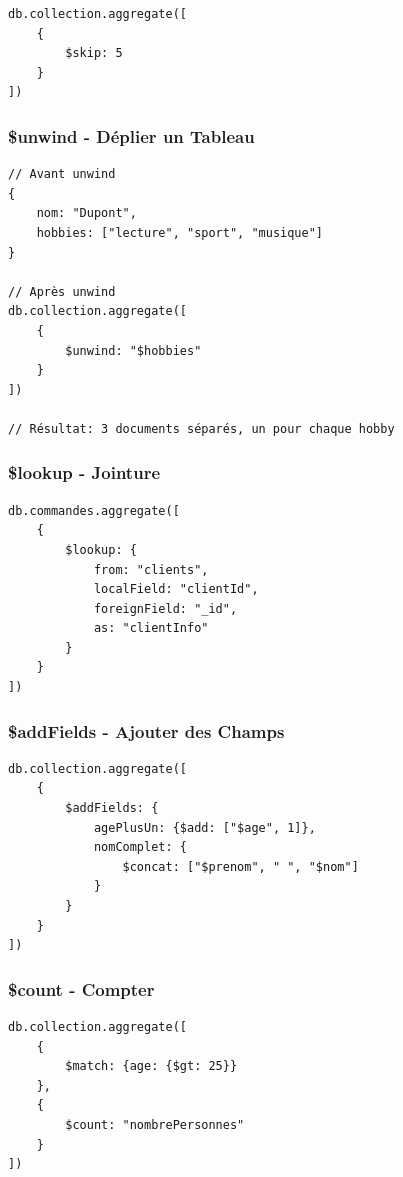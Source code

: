 \documentclass[11pt,a4paper]{article}
\begin{document}
\begin{lstlisting}
db.collection.aggregate([
    {
        $skip: 5
    }
])
\end{lstlisting}

\subsubsection{\$unwind - Déplier un Tableau}

\begin{lstlisting}
// Avant unwind
{
    nom: "Dupont",
    hobbies: ["lecture", "sport", "musique"]
}

// Après unwind
db.collection.aggregate([
    {
        $unwind: "$hobbies"
    }
])

// Résultat: 3 documents séparés, un pour chaque hobby
\end{lstlisting}

\subsubsection{\$lookup - Jointure}

\begin{lstlisting}
db.commandes.aggregate([
    {
        $lookup: {
            from: "clients",
            localField: "clientId",
            foreignField: "_id",
            as: "clientInfo"
        }
    }
])
\end{lstlisting}

\subsubsection{\$addFields - Ajouter des Champs}

\begin{lstlisting}
db.collection.aggregate([
    {
        $addFields: {
            agePlusUn: {$add: ["$age", 1]},
            nomComplet: {
                $concat: ["$prenom", " ", "$nom"]
            }
        }
    }
])
\end{lstlisting}

\subsubsection{\$count - Compter}

\begin{lstlisting}
db.collection.aggregate([
    {
        $match: {age: {$gt: 25}}
    },
    {
        $count: "nombrePersonnes"
    }
])
\end{lstlisting}
\end{document}
